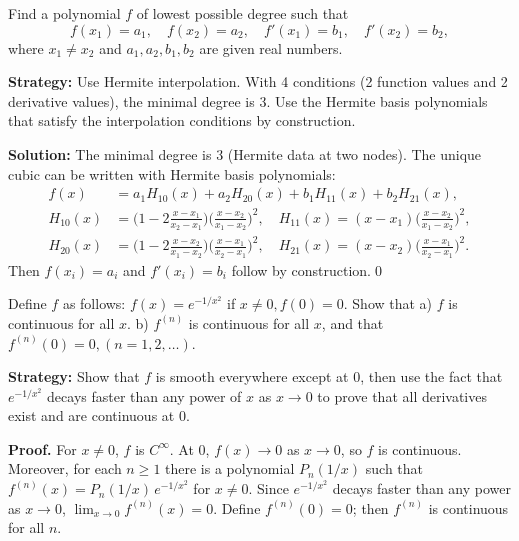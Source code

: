 \begin{problembox}
Find a polynomial \( f \) of lowest possible degree such that
\[ f(x_1) = a_1, \quad f(x_2) = a_2, \quad f'(x_1) = b_1, \quad f'(x_2) = b_2, \]
where \( x_1 \neq x_2 \) and \( a_1, a_2, b_1, b_2 \) are given real numbers.
\end{problembox}

\noindent\textbf{Strategy:} Use Hermite interpolation. With 4 conditions (2 function values and 2 derivative values), the minimal degree is 3. Use the Hermite basis polynomials that satisfy the interpolation conditions by construction.

\bigskip\noindent\textbf{Solution:}
The minimal degree is \textbf{$3$} (Hermite data at two nodes). The unique cubic can be written with Hermite basis polynomials:
\[\begin{aligned}
f(x)&=a_1 H_{10}(x)+a_2 H_{20}(x)+b_1 H_{11}(x)+b_2 H_{21}(x),\\
H_{10}(x)&=\Big(1-2\frac{x-x_1}{x_2-x_1}\Big)\Big(\frac{x-x_2}{x_1-x_2}\Big)^2,\quad H_{11}(x)=(x-x_1)\Big(\frac{x-x_2}{x_1-x_2}\Big)^2,\\
H_{20}(x)&=\Big(1-2\frac{x-x_2}{x_1-x_2}\Big)\Big(\frac{x-x_1}{x_2-x_1}\Big)^2,\quad H_{21}(x)=(x-x_2)\Big(\frac{x-x_1}{x_2-x_1}\Big)^2.
\end{aligned}\]
Then $f(x_i)=a_i$ and $f'(x_i)=b_i$ follow by construction.\qed


\begin{problembox}
Define \( f \) as follows: \( f(x) = e^{-1/x^2} \) if \( x \neq 0, f(0) = 0 \). Show that
a) \( f \) is continuous for all \( x \).
b) \( f^{(n)} \) is continuous for all \( x \), and that \( f^{(n)}(0) = 0, (n = 1, 2, \ldots ) \).
\end{problembox}

\noindent\textbf{Strategy:} Show that \( f \) is smooth everywhere except at 0, then use the fact that \( e^{-1/x^2} \) decays faster than any power of \( x \) as \( x \to 0 \) to prove that all derivatives exist and are continuous at 0.

\noindent\textbf{Proof.}
For $x\ne 0$, $f$ is $C^{\infty}$. At $0$, $f(x)\to 0$ as $x\to 0$, so $f$ is continuous. Moreover, for each $n\ge 1$ there is a polynomial $P_n(1/x)$ such that $f^{(n)}(x)=P_n(1/x)\,e^{-1/x^2}$ for $x\ne 0$. Since $e^{-1/x^2}$ decays faster than any power as $x\to 0$, $\lim_{x\to 0}f^{(n)}(x)=0$. Define $f^{(n)}(0)=0$; then $f^{(n)}$ is continuous for all $n$.



